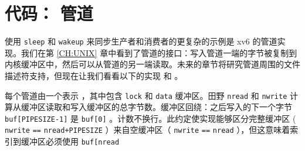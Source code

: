 \documentclass[UTF8]{article}
\begin{document}
    \section{代码： 管道  }    使用    \lstinline{sleep}    和    \lstinline{wakeup}    来同步生产者和消费者的更复杂的示例是 xv6 的管道实现。我们在第    \ref{CH:UNIX}    章中看到了管道的接口：写入管道一端的字节被复制到内核缓冲区中，然后可以从管道的另一端读取。未来的章节将研究管道周围的文件描述符支持，但现在让我们看看以下的实现
        和
        。  

每个管道由一个表示
        ，其中包含
    \lstinline{lock}    和
    \lstinline{data}    缓冲区。田野
    \lstinline{nread}    和
    \lstinline{nwrite}    计算从缓冲区读取和写入缓冲区的总字节数。缓冲区回绕：之后写入的下一个字节
    \lstinline{buf[PIPESIZE-1]}    是
    \lstinline{buf[0]}    。计数不换行。此约定使实现能够区分完整缓冲区 (    \lstinline{nwrite}   
    \lstinline{==}   
    \lstinline{nread+PIPESIZE}    ）来自空缓冲区（    \lstinline{nwrite}   
    \lstinline{==}   
    \lstinline{nread}    ），但这意味着索引到缓冲区必须使用
    \lstinline{buf[nread}   
\end{document}

